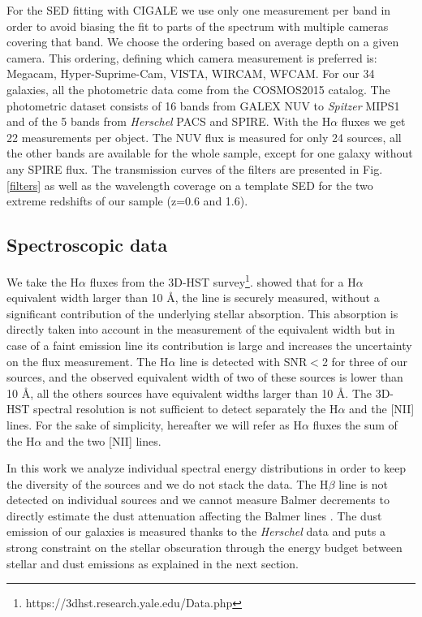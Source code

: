 \documentclass{aa}
\begin{document}
For the SED fitting with CIGALE we use only one measurement per band in order to avoid biasing the fit to parts of the spectrum with multiple cameras covering that band. We choose the ordering based on average depth on a given camera. This ordering, defining which camera measurement is preferred is: Megacam, Hyper-Suprime-Cam, VISTA, WIRCAM, WFCAM. For our 34 galaxies, all the photometric data come from the COSMOS2015 catalog. 
The photometric dataset consists of  16 bands from  GALEX NUV to {\it Spitzer} MIPS1 and of the 5 bands from {\it Herschel} PACS and SPIRE. With the H$\alpha$ fluxes we get 22 measurements per object. The NUV flux is measured  for only 24 sources, all the other bands are available for the whole sample, except for one galaxy  without any  SPIRE flux. The transmission curves of  the  filters  are presented in Fig. \ref{filters} {as well as the wavelength coverage on a  template SED for the two extreme redshifts of our sample (z=0.6 and 1.6).}


\subsection{Spectroscopic data}
We take the H$\alpha$  fluxes from the  3D-HST survey\footnote{https://3dhst.research.yale.edu/Data.php}.  \citet{vanDokkum11} showed that for a H$\alpha$  equivalent width larger than 10 \AA, the line is securely measured, without a significant contribution of the underlying stellar absorption. This absorption is directly taken into account in the measurement of the equivalent width \citep{Momcheva16} but in case of a faint emission line its contribution is large and increases the uncertainty on the flux measurement. The H$\alpha$ line  is detected with  SNR$<$2  for three of our sources,  and the observed equivalent width of two of these sources is lower than 10 \AA, all the others sources have  equivalent widths larger than 10 \AA.
The 3D-HST spectral resolution is not sufficient to detect separately the H$\alpha$ and the [NII] lines. For the sake of simplicity, hereafter we will refer as H$\alpha$ fluxes the sum of the H$\alpha$ and the two [NII] lines.

In this work we analyze individual spectral energy distributions in order to keep the diversity of the sources and  we do not  stack the data.  The H$\beta$ line is not detected on individual sources and we cannot measure Balmer decrements to directly estimate the dust attenuation affecting the Balmer lines \citep[e.g.,][]{Garn10,Price14}. The dust emission of our galaxies is measured thanks to  the {\it Herschel}  data and puts a strong constraint on the stellar obscuration through the energy budget between  stellar and dust emissions as explained in the next section.
\end{document}
